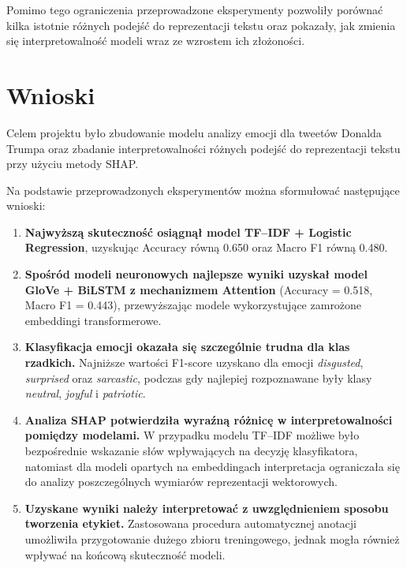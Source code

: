 \documentclass[a4paper,12pt]{article}
\begin{document}
Pomimo tego ograniczenia przeprowadzone eksperymenty pozwoliły porównać kilka istotnie różnych podejść do reprezentacji tekstu oraz pokazały, jak zmienia się interpretowalność modeli wraz ze wzrostem ich złożoności.



\section{Wnioski}

Celem projektu było zbudowanie modelu analizy emocji dla tweetów Donalda Trumpa oraz zbadanie interpretowalności różnych podejść do reprezentacji tekstu przy użyciu metody SHAP.

Na podstawie przeprowadzonych eksperymentów można sformułować następujące wnioski:

\begin{enumerate}
\item \textbf{Najwyższą skuteczność osiągnął model TF--IDF + Logistic Regression}, uzyskując Accuracy równą 0.650 oraz Macro F1 równą 0.480.

\item \textbf{Spośród modeli neuronowych najlepsze wyniki uzyskał model GloVe + BiLSTM z mechanizmem Attention} (Accuracy = 0.518, Macro F1 = 0.443), przewyższając modele wykorzystujące zamrożone embeddingi transformerowe.

\item \textbf{Klasyfikacja emocji okazała się szczególnie trudna dla klas rzadkich.} Najniższe wartości F1-score uzyskano dla emocji \textit{disgusted}, \textit{surprised} oraz \textit{sarcastic}, podczas gdy najlepiej rozpoznawane były klasy \textit{neutral}, \textit{joyful} i \textit{patriotic}.

\item \textbf{Analiza SHAP potwierdziła wyraźną różnicę w interpretowalności pomiędzy modelami.} W przypadku modelu TF--IDF możliwe było bezpośrednie wskazanie słów wpływających na decyzję klasyfikatora, natomiast dla modeli opartych na embeddingach interpretacja ograniczała się do analizy poszczególnych wymiarów reprezentacji wektorowych.

\item \textbf{Uzyskane wyniki należy interpretować z uwzględnieniem sposobu tworzenia etykiet.} Zastosowana procedura automatycznej anotacji umożliwiła przygotowanie dużego zbioru treningowego, jednak mogła również wpływać na końcową skuteczność modeli.

\end{enumerate}
\end{document}
